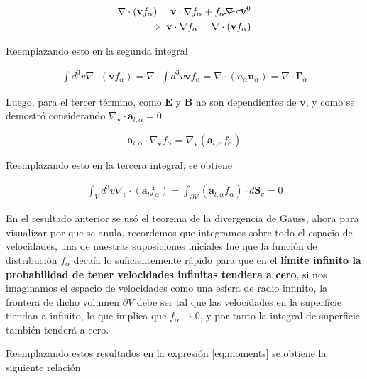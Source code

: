 		\begin{eqnarray*}
			\nabla\cdot(\textbf{v}f_\alpha) = \textbf{v}\cdot\nabla f_\alpha + f_\alpha \cancel{\nabla\cdot\textbf{v}}^{0} \\
			\implies \textbf{v}\cdot\nabla f_\alpha = \nabla\cdot(\textbf{v}f_\alpha)
		\end{eqnarray*}
		
		Reemplazando esto en la segunda integral
		
		\begin{eqnarray*}
      \int d^3v \nabla\cdot(\textbf{v}f_\alpha) = \nabla\cdot \int d^3v \textbf{v}f_\alpha = \nabla\cdot(n_\alpha \textbf{u}_\alpha) = \nabla\cdot\pmb{\Gamma}_\alpha 
    \end{eqnarray*}
		
    Luego, para el tercer t\'ermino, como $\textbf{E}$ y $\textbf{B}$ no son dependientes de $\textbf{v}$, y como se demostr\'o considerando $\nabla_\textbf{v}\cdot\textbf{a}_{l,\alpha} = 0$

    \begin{equation*}
      \textbf{a}_{l, \alpha}\cdot \nabla_\textbf{v} f_\alpha = \nabla_\textbf{v}(\textbf{a}_{l,\alpha}f_\alpha)
    \end{equation*}
		
		Reemplazando esto en la tercera integral, se obtiene
		
		\begin{eqnarray*}
      \int_V d^3v \nabla_v\cdot(\textbf{a}_lf_\alpha) = \int_{\partial V} (\textbf{a}_{l,\alpha}f_\alpha) \cdot d\textbf{S}_v = 0
		\end{eqnarray*}	
		
    En el resultado anterior se us\'o el teorema de la divergencia de Gauss, ahora para visualizar por que se anula, recordemos que integramos sobre todo el espacio de velocidades, una de nuestras suposiciones iniciales fue que la funci\'on de distribuci\'on $f_\alpha$ deca\'ia lo suficientemente r\'apido para que en el \textbf{l\'imite infinito la probabilidad de tener velocidades infinitas tendiera a cero}, si nos imaginamos el espacio de velocidades como una esfera de radio infinito, la frontera de dicho volumen $\partial V$ debe ser tal que las velocidades en la superficie tiendan a infinito, lo que implica que $f_\alpha \rightarrow 0$, y por tanto la integral de superficie tambi\'en tender\'a a cero.

Reemplazando estos resultados en la expresi\'on \eqref{eq:moments} se obtiene la siguiente relaci\'on

